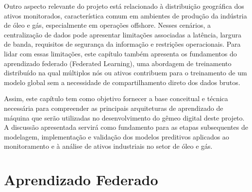 Outro aspecto relevante do projeto está relacionado à distribuição geográfica dos ativos monitorados, característica comum em ambientes de produção da indústria de óleo e gás, especialmente em operações offshore. Nesses cenários, a centralização de dados pode apresentar limitações associadas a latência, largura de banda, requisitos de segurança da informação e restrições operacionais. Para lidar com essas limitações, este capítulo também apresenta os fundamentos do aprendizado federado (Federated Learning), uma abordagem de treinamento distribuído na qual múltiplos nós ou ativos contribuem para o treinamento de um modelo global sem a necessidade de compartilhamento direto dos dados brutos.

Assim, este capítulo tem como objetivo fornecer a base conceitual e técnica necessária para compreender as principais arquiteturas de aprendizado de máquina que serão utilizadas no desenvolvimento do gêmeo digital deste projeto. A discussão apresentada servirá como fundamento para as etapas subsequentes de modelagem, implementação e validação dos modelos preditivos aplicados ao monitoramento e à análise de ativos industriais no setor de óleo e gás.

\section{Aprendizado Federado}